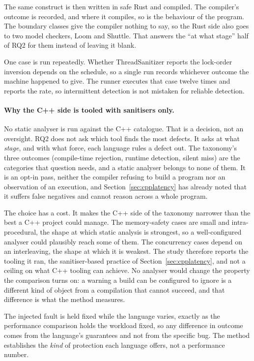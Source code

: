 \documentclass[english,twoside,openright,a4paper,censored,csm,software-track-2020]{HYthesisML}
\begin{document}
The same construct is then written in safe Rust and compiled. The compiler's outcome is
recorded, and where it compiles, so is the behaviour of the program. The boundary classes give
the compiler nothing to say, so the Rust side also goes to two model checkers, Loom and Shuttle.
That answers the ``at what stage'' half of RQ2 for them instead of leaving it blank.

One case is run repeatedly. Whether ThreadSanitizer reports the lock-order inversion depends on
the schedule, so a single run records whichever outcome the machine happened to give. The runner
executes that case twelve times and reports the rate, so intermittent detection is not mistaken
for reliable detection.

\paragraph{Why the C++ side is tooled with sanitisers only.}
No static analyser is run against the C++ catalogue. That is a decision, not an oversight. RQ2
does not ask which tool finds the most defects. It asks at what \emph{stage}, and with what
force, each language rules a defect out. The taxonomy's three outcomes (compile-time rejection,
runtime detection, silent miss) are the categories that question needs, and a static analyser
belongs to none of them. It is an opt-in pass, neither the compiler refusing to build a program
nor an observation of an execution, and Section~\ref{sec:cpplatency} has already noted that it
suffers false negatives and cannot reason across a whole program.

The choice has a cost. It makes the C++ side of the taxonomy narrower than the best a C++
project could manage. The memory-safety cases are small and intra-procedural, the shape at which
static analysis is strongest, so a well-configured analyser could plausibly reach some of them.
The concurrency cases depend on an interleaving, the shape at which it is weakest. The study
therefore reports the tooling it ran, the sanitiser-based practice of
Section~\ref{sec:cpplatency}, and not a ceiling on what C++ tooling can achieve. No analyser
would change the property the comparison turns on: a warning a build can be configured to ignore
is a different kind of object from a compilation that cannot succeed, and that difference is
what the method measures.

The injected fault is held fixed while the language varies, exactly as the performance
comparison holds the workload fixed, so any difference in outcome comes from the language's
guarantees and not from the specific bug. The method establishes the \emph{kind} of protection
each language offers, not a performance number.
\end{document}
